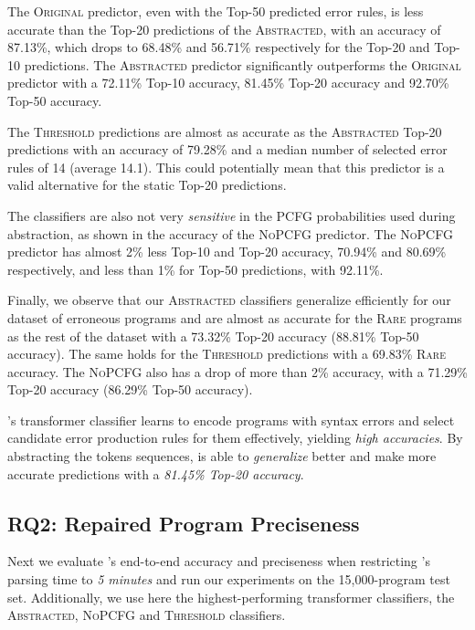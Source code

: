The \textsc{Original} predictor, even with the Top-50 predicted error rules, is
less accurate than the Top-20 predictions of the \textsc{Abstracted}, with an
accuracy of 87.13\%, which drops to 68.48\% and 56.71\% respectively for the
Top-20 and Top-10 predictions. The \textsc{Abstracted} predictor significantly
outperforms the \textsc{Original} predictor with a 72.11\% Top-10 accuracy,
81.45\% Top-20 accuracy and 92.70\% Top-50 accuracy.

The \textsc{Threshold} predictions are almost as accurate as the
\textsc{Abstracted} Top-20 predictions with an accuracy of 79.28\% and a median
number of selected error rules of 14 (average 14.1). This could potentially mean
that this predictor is a valid alternative for the static Top-20 predictions.

The classifiers are also not very \emph{sensitive} in the PCFG probabilities
used during abstraction, as shown in the accuracy of the \textsc{NoPCFG}
predictor. The \textsc{NoPCFG} predictor has almost 2\% less Top-10 and Top-20
accuracy, 70.94\% and 80.69\% respectively, and less than 1\% for Top-50
predictions, with 92.11\%.

Finally, we observe that our \textsc{Abstracted} classifiers generalize
efficiently for our dataset of erroneous \python programs and are almost as
accurate for the \textsc{Rare} programs as the rest of the dataset with a
73.32\% Top-20 accuracy (88.81\% Top-50 accuracy). The same holds for the
\textsc{Threshold} predictions with a 69.83\% \textsc{Rare} accuracy. The
\textsc{NoPCFG} also has a drop of more than 2\% accuracy, with a 71.29\% Top-20
accuracy (86.29\% Top-50 accuracy).

\begin{framed}
  \noindent \toolname's transformer classifier learns to encode programs with
  syntax errors and select candidate error production rules for them
  effectively, yielding \emph{high accuracies}. By abstracting the tokens
  sequences, \toolname is able to \emph{generalize} better and make more
  accurate predictions with a \emph{81.45\% Top-20 accuracy}.
\end{framed}


\subsection{RQ2: Repaired Program Preciseness}
\label{sec:eval:precise}

Next we evaluate \toolname's end-to-end accuracy and preciseness when
restricting \toolname's parsing time to \emph{5 minutes} and run our experiments
on the 15,000-program test set. Additionally, we use here the highest-performing
transformer classifiers, \ie the \textsc{Abstracted}, \textsc{NoPCFG} and
\textsc{Threshold} classifiers.

